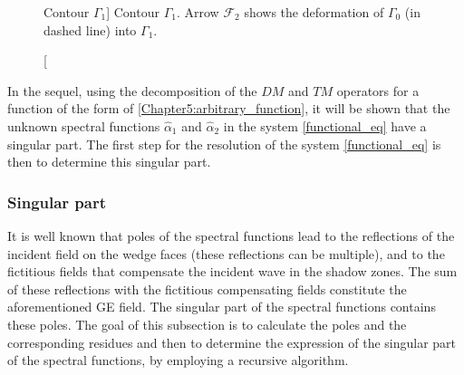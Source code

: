 \begin{figure}[ht]
\centering
{}
\caption
[Contour $\Gamma_1$]
{Contour $\Gamma_1$. Arrow $\mathcal{F}_2$ shows the deformation of $\Gamma_0$ (in dashed line) into $\Gamma_1$.}
\label{chapter5:figure5}
\end{figure}

In the sequel, using the decomposition of the $DM$ and $TM$ operators for a function of the form of \eqref{Chapter5:arbitrary_function}, it will be shown that the unknown spectral functions $\hat{\alpha}_1$ and $\hat{\alpha}_2$ in the system \eqref{functional_eq} have a singular part. The first step for the resolution of the system \eqref{functional_eq} is then to determine this singular part.

\subsubsection{Singular part}
\label{Chapter5:sing_part}
It is well known that poles of the spectral functions lead to the reflections of the incident field on the wedge faces (these reflections can be multiple), and to the fictitious fields that compensate the incident wave in the shadow zones. The sum of these reflections with the fictitious compensating fields constitute the aforementioned GE field. The singular part of the spectral functions contains these poles. The goal of this subsection is to calculate the poles and the corresponding residues and then to determine the expression of the singular part of the spectral functions, by employing a recursive algorithm. 

